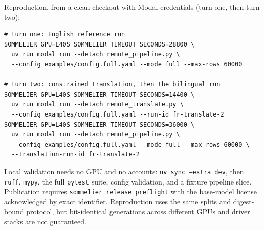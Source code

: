 \documentclass{article}
\begin{document}
Reproduction, from a clean checkout with Modal credentials (turn one, then turn two):

{\small
\begin{verbatim}
# turn one: English reference run
SOMMELIER_GPU=L40S SOMMELIER_TIMEOUT_SECONDS=28800 \
  uv run modal run --detach remote_pipeline.py \
  --config examples/config.full.yaml --mode full --max-rows 60000

# turn two: constrained translation, then the bilingual run
SOMMELIER_GPU=L40S SOMMELIER_TIMEOUT_SECONDS=14400 \
  uv run modal run --detach remote_translate.py \
  --config examples/config.full.yaml --run-id fr-translate-2
SOMMELIER_GPU=L40S SOMMELIER_TIMEOUT_SECONDS=36000 \
  uv run modal run --detach remote_pipeline.py \
  --config examples/config.full.yaml --mode full --max-rows 60000 \
  --translation-run-id fr-translate-2
\end{verbatim}
}

Local validation needs no GPU and no accounts: \texttt{uv sync --extra dev}, then \texttt{ruff}, \texttt{mypy}, the full \texttt{pytest} suite, config validation, and a fixture pipeline slice. Publication requires \texttt{sommelier release preflight} with the base-model license acknowledged by exact identifier. Reproduction uses the same splits and digest-bound protocol, but bit-identical generations across different GPUs and driver stacks are not guaranteed.
\end{document}
